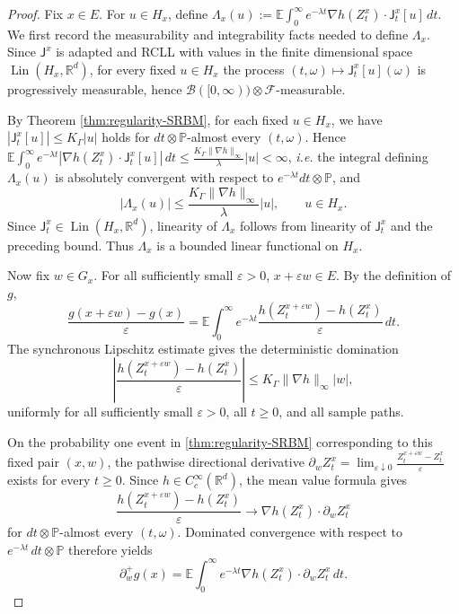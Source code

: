 \documentclass[10pt,a4paper]{amsart}
\begin{document}
\begin{proof}
Fix \(x\in E\). For \(u\in H_x\), define $\Lambda_x(u)
:=
\mathbb E\int_0^\infty e^{-\lambda t}
\nabla h(Z_t^x)\cdot \mathsf J_t^x[u]\,dt .$ We first record the measurability and integrability facts needed to define
\(\Lambda_x\). Since \(\mathsf J^x\) is adapted and RCLL with values in the finite dimensional space
\(\operatorname{Lin}(H_x,\mathbb R^d)\), for every fixed \(u\in H_x\) the process $(t,\omega)\mapsto \mathsf J_t^x[u](\omega)$ is progressively measurable, hence \(\mathcal B([0,\infty))\otimes\mathcal F\)-measurable.


By Theorem \ref{thm:regularity-SRBM}, for each fixed \(u\in H_x\), we have 
\(
|\mathsf J_t^x[u]|\le K_\Gamma |u|\) holds for \(dt\otimes \mathbb P\)-almost every \((t,\omega)\). Hence  $\mathbb E\int_0^\infty e^{-\lambda t}
\left|\nabla h(Z_t^x)\cdot \mathsf J_t^x[u]\right|\,dt
\le
\frac{K_\Gamma\|\nabla h\|_\infty}{\lambda}|u|<\infty $, \emph{i.e.} the integral
defining \(\Lambda_x(u)\) is absolutely convergent with
respect to \(e^{-\lambda t}dt\otimes\mathbb P\), and
\[
|\Lambda_x(u)|
\le
\frac{K_\Gamma\|\nabla h\|_\infty}{\lambda}|u|,
\qquad u\in H_x .
\]
Since \(\mathsf J_t^x\in \operatorname{Lin}(H_x,\mathbb R^d)\), linearity of
\(\Lambda_x\) follows from linearity of \(\mathsf J_t^x\) and the preceding bound.
Thus \(\Lambda_x\) is a bounded linear functional on \(H_x\).

Now fix \(w\in G_x\). For all sufficiently small \(\varepsilon>0\),
\(x+\varepsilon w\in E\). By the definition of \(g\),
\begin{equation}
\frac{g(x+\varepsilon w)-g(x)}{\varepsilon}
=
\mathbb E\int_0^\infty e^{-\lambda t}
\frac{h(Z_t^{x+\varepsilon w})-h(Z_t^x)}{\varepsilon}\,dt .
\end{equation}
The synchronous Lipschitz estimate gives the deterministic domination
\begin{equation}
\left|
\frac{h(Z_t^{x+\varepsilon w})-h(Z_t^x)}{\varepsilon}
\right|
\le
K_\Gamma \|\nabla h\|_\infty |w| ,
\end{equation}
uniformly for all sufficiently small \(\varepsilon>0\), all \(t\ge0\), and all
sample paths.

On the probability one event in \cref{thm:regularity-SRBM} corresponding to this fixed pair
\((x,w)\), the pathwise directional derivative
\(
\partial_w Z_t^x
=
\lim_{\varepsilon\downarrow0}
\frac{Z_t^{x+\varepsilon w}-Z_t^x}{\varepsilon}\) exists for every \(t\ge0\). Since \(h\in C_c^\infty(\mathbb R^d)\), the
mean value formula gives
\[
\frac{h(Z_t^{x+\varepsilon w})-h(Z_t^x)}{\varepsilon}
\longrightarrow
\nabla h(Z_t^x)\cdot \partial_w Z_t^x
\]
for \(dt\otimes\mathbb P\)-almost every \((t,\omega)\). Dominated convergence
with respect to \(e^{-\lambda t}\,dt\otimes\mathbb P\) therefore yields
\begin{equation}\label{eq:resolvent-derivative-process}
\partial_w^+ g(x)
=
\mathbb E\int_0^\infty e^{-\lambda t}
\nabla h(Z_t^x)\cdot \partial_w Z_t^x\,dt .
\end{equation}


\end{proof}
\end{document}
